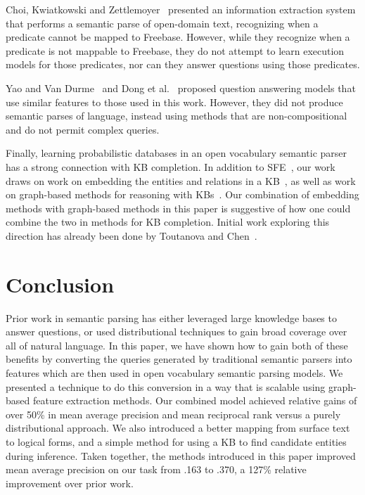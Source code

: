 \documentclass[11pt,letterpaper]{article}
\begin{document}
Choi, Kwiatkowski and Zettlemoyer~
presented an information extraction system that performs a semantic parse of open-domain text,
recognizing when a predicate cannot be mapped to Freebase.  However, while they recognize when a
predicate is not mappable to Freebase, they do not attempt to learn execution models for those
predicates, nor can they answer questions using those predicates.

Yao and Van Durme~ and Dong et
al.~ proposed question answering models that use similar
features to those used in this work.  However, they did not produce semantic parses of language,
instead using methods that are non-compositional and do not permit complex queries.

Finally, learning probabilistic databases in an open vocabulary semantic parser has a strong
connection with KB completion.  In addition to SFE~\cite{gardner-2015-sfe}, our work draws on work
on embedding the entities and relations in a
KB~\cite{riedel-2013-mf-universal-schema,nickel-2011-rescal,%
bordes-2013-transe,nickel-2014-are,toutanova-2015-joint-text-kb-embedding}, as well as work on
graph-based methods for reasoning with
KBs~\cite{lao-2010-original-pra,gardner-2014-vector-space-pra,neelakantan-2015-rnn-kbc,%
bornea-2015-relational-path-mining}.  Our combination of embedding methods with graph-based methods
in this paper is suggestive of how one could combine the two in methods for KB completion.  Initial
work exploring this direction has already been done by Toutanova and
Chen~.


\vspace{-1.70mm}
\section{Conclusion}
\label{sec:conclusion}

Prior work in semantic parsing has either leveraged large knowledge bases to answer questions, or
used distributional techniques to gain broad coverage over all of natural language.  In this paper,
we have shown how to gain both of these benefits by converting the queries generated by traditional
semantic parsers into features which are then used in open vocabulary semantic parsing models.  We
presented a technique to do this conversion in a way that is scalable using graph-based feature
extraction methods.  Our combined model achieved relative gains of over 50\% in mean average
precision and mean reciprocal rank versus a purely distributional approach.  We also introduced a
better mapping from surface text to logical forms, and a simple method for using a KB to find
candidate entities during inference.  Taken together, the methods introduced in this paper improved
mean average precision on our task from .163 to .370, a 127\% relative improvement over prior work.
\end{document}
